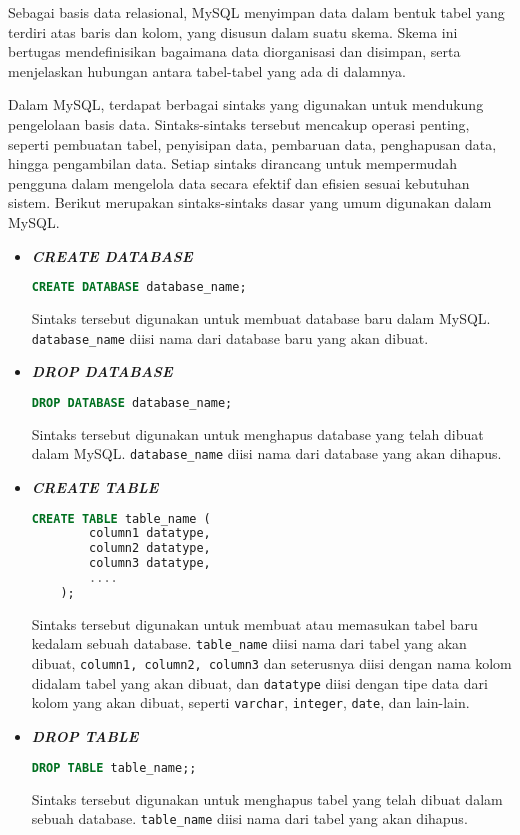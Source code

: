 Sebagai basis data relasional, MySQL menyimpan data dalam bentuk tabel yang terdiri atas baris dan kolom, yang disusun dalam suatu skema. Skema ini bertugas mendefinisikan bagaimana data diorganisasi dan disimpan, serta menjelaskan hubungan antara tabel-tabel yang ada di dalamnya.

Dalam MySQL, terdapat berbagai sintaks yang digunakan untuk mendukung pengelolaan basis data. Sintaks-sintaks tersebut mencakup operasi penting, seperti pembuatan tabel, penyisipan data, pembaruan data, penghapusan data, hingga pengambilan data. Setiap sintaks dirancang untuk mempermudah pengguna dalam mengelola data secara efektif dan efisien sesuai kebutuhan sistem. Berikut merupakan sintaks-sintaks dasar yang umum digunakan dalam MySQL.
\begin{itemize}
    \item \textbf{\textit{CREATE DATABASE}}
    \begin{lstlisting}[language=SQL]
    CREATE DATABASE database_name;
    \end{lstlisting}
    Sintaks tersebut digunakan untuk membuat database baru dalam MySQL. \texttt{database\_name} diisi nama dari database baru yang akan dibuat.
    \item \textbf{\textit{DROP DATABASE}}
    \begin{lstlisting}[language=SQL]
    DROP DATABASE database_name;
    \end{lstlisting}
    Sintaks tersebut digunakan untuk menghapus database yang telah dibuat dalam MySQL. \texttt{database\_name} diisi nama dari database yang akan dihapus.
    
    \item \textbf{\textit{CREATE TABLE}}
    \begin{lstlisting}[language=SQL]
    CREATE TABLE table_name (
        column1 datatype,
        column2 datatype,
        column3 datatype,
        ....
    );
    \end{lstlisting}
    Sintaks tersebut digunakan untuk membuat atau memasukan tabel baru kedalam sebuah database. \texttt{table\_name} diisi nama dari tabel yang akan dibuat, \texttt{column1, column2, column3} dan seterusnya diisi dengan nama kolom didalam tabel yang akan dibuat, dan \texttt{datatype} diisi dengan tipe data dari kolom yang akan dibuat, seperti \texttt{varchar}, \texttt{integer}, \texttt{date}, dan lain-lain.

    \item \textbf{\textit{DROP TABLE}}
    \begin{lstlisting}[language=SQL]
    DROP TABLE table_name;;
    \end{lstlisting}
    Sintaks tersebut digunakan untuk menghapus tabel yang telah dibuat dalam sebuah database. \texttt{table\_name} diisi nama dari tabel yang akan dihapus.


\end{itemize}
